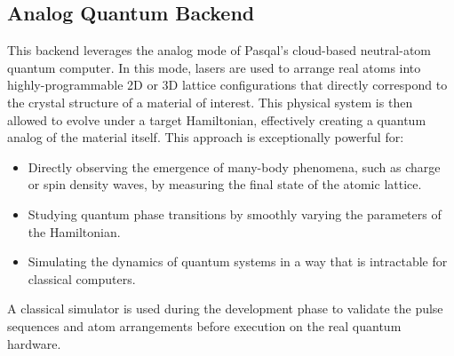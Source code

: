 \subsection{Analog Quantum Backend}
This backend leverages the analog mode of Pasqal's cloud-based neutral-atom quantum computer. In this mode, lasers are used to arrange real atoms into highly-programmable 2D or 3D lattice configurations that directly correspond to the crystal structure of a material of interest. This physical system is then allowed to evolve under a target Hamiltonian, effectively creating a quantum analog of the material itself. This approach is exceptionally powerful for:
\begin{itemize}
    \item Directly observing the emergence of many-body phenomena, such as charge or spin density waves, by measuring the final state of the atomic lattice.
    \item Studying quantum phase transitions by smoothly varying the parameters of the Hamiltonian.
    \item Simulating the dynamics of quantum systems in a way that is intractable for classical computers.
\end{itemize}
A classical simulator is used during the development phase to validate the pulse sequences and atom arrangements before execution on the real quantum hardware.
